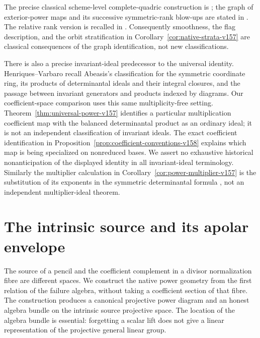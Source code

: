 \documentclass[11pt,reqno]{amsart}
\numberwithin{equation}{section}
\theoremstyle{definition}\newtheorem{definition}[theorem]{Definition}
\theoremstyle{remark}\newtheorem{remark}[theorem]{Remark}
\begin{document}
The precise classical scheme-level complete-quadric construction is
\cite[Theorem~6.3]{Vainsencher1982}; the graph of exterior-power maps
and its successive symmetric-rank blow-ups are stated in
\cite[Remark~2.5 and Construction~2.6]{Massarenti2020}.
The relative rank version is recalled in
\cite[Definition~2.5, Remark~2.6 and Theorem~2.14]{CasarottiCornianiMassarenti2023}.
Consequently smoothness, the flag description, and the orbit
stratification in Corollary~\ref{cor:native-strata-v157} are classical
consequences of the graph identification, not new classifications.

There is also a precise invariant-ideal predecessor to the universal
identity. Henriques--Varbaro \cite[\S2.4, Theorems~2.6--2.8]{HenriquesVarbaro2016}
recall Abeasis's classification for the symmetric coordinate ring,
its products of determinantal ideals and their integral closures,
and the passage between invariant generators and products indexed
by diagrams. Our coefficient-space comparison uses this same
multiplicity-free setting. Theorem~\ref{thm:universal-power-v157}
identifies a particular multiplication coefficient map with the
balanced determinantal product as an ordinary ideal; it is not
an independent classification of invariant ideals. The exact
coefficient identification in Proposition~\ref{prop:coefficient-conventions-v158}
explains which map is being specialized on nonreduced bases.
We assert no exhaustive historical nonanticipation of the displayed
identity in all invariant-ideal terminology. Similarly the
multiplier calculation in Corollary~\ref{cor:power-multiplier-v157} is the
substitution of its exponents in the symmetric determinantal formula
\cite[Theorem~4.8]{HenriquesVarbaro2016}, not an independent
multiplier-ideal theorem.

\section{The intrinsic source and its apolar envelope}
\label{sec:intrinsic-envelope-v158}
The source of a pencil and the coefficient complement in a divisor
normalization fibre are different spaces. We construct the native power
geometry from the first relation of the failure algebra, without taking
a coefficient section of that fibre. The construction produces a
canonical projective power diagram and an honest algebra bundle on the
intrinsic source projective space. The location of the algebra bundle
is essential: forgetting a scalar lift does not give a linear
representation of the projective general linear group.
\end{document}
